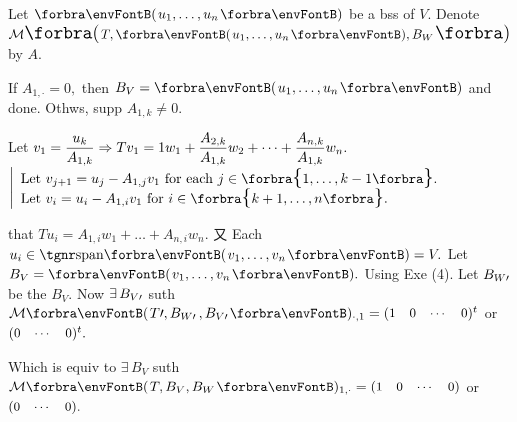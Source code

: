 \par\quad
Let $\Par{u_1,\dots,u_n}$ be a bss of $V$. Denote $\Mt[\BigPar]{T,\Par{u_1,\dots,u_n},B_W}$ by $A.$\par\quad
If $A_{1,\cdot}=0,$ then $B_V=\Par{u_1,\dots,u_n}$ and done. Othws, supp $A_{1,k}\neq 0.$\par\quad
Let $v_1={\displaystyle{\frac{u_k}{A_{1,k}}}}\Rightarrow Tv_1=1w_1+{\displaystyle{\frac{A_{2,k}}{A_{1,k}}}}w_2+\dots+{\displaystyle{\frac{A_{n,k}}{A_{1,k}}}}w_n.$\;$\MathLeftMid{l}{$
\!\!Let $v_{j+1}=u_{j}-A_{1,j}v_1$ for each $j\in\Bra{1,\dots,k-1}.\\$
\!\!Let $v_i=u_i-A_{1,i} v_1$ for $i\in\Bra{k+1,\dots,n}.}$\vspace{4pt}\par\quad
\NOTICE that $Tu_i=A_{1,i}w_1+\dots+A_{n,i}w_n.$ 又 Each $u_i\in\Span{v_1,\dots,v_n}=V.$ Let $B_V=\Par{v_1,\dots,v_n}.$\PfEnd\vspace{4pt}\quad
\Or Using Exe (4). Let $B_{W\prime}$ be the $B_V.$ Now $\exists\,B_{V\prime}$ suth $\Mt{T\apostrophe,B_{W\apostrophe}\,,B_{V\apostrophe}}{_{\cdot,1}}={\small\begin{pmatrix}1&0&\cdots&0\end{pmatrix}}{^t}$ or ${\small\begin{pmatrix}0&\cdots&0\end{pmatrix}}{^t}.$\par\quad
Which is equiv to $\exists\,B_V$  suth $\Mt{T,B_V,B_W}{_{1,\cdot}}={\small\begin{pmatrix}1&0&\cdots&0\end{pmatrix}}$ or ${\small\begin{pmatrix}0&\cdots&0\end{pmatrix}}.$\PfEnd
\SepLine

